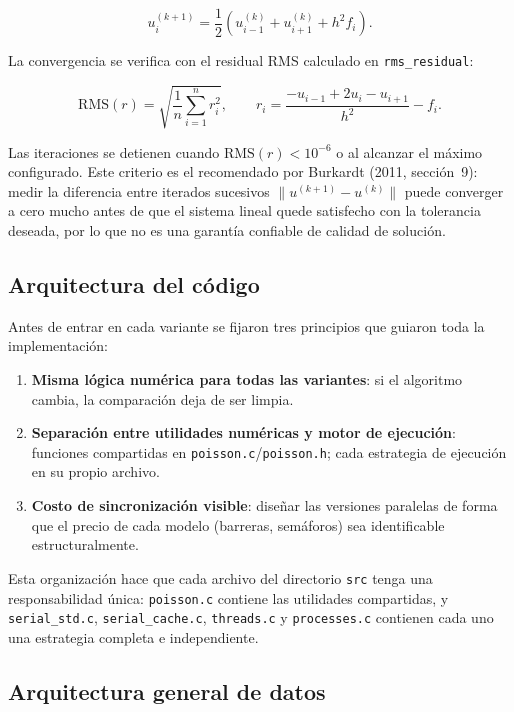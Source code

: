 \begin{equation}
    u_i^{(k+1)} = \frac{1}{2}\left(u_{i-1}^{(k)} + u_{i+1}^{(k)} + h^2 f_i\right).
    \label{eq:jacobi}
\end{equation}

La convergencia se verifica con el residual RMS calculado en \texttt{rms\_residual}:

\begin{equation}
    \mathrm{RMS}(r) = \sqrt{\frac{1}{n}\sum_{i=1}^{n} r_i^2}, \qquad r_i = \frac{-u_{i-1}+2u_i-u_{i+1}}{h^2} - f_i.
\end{equation}

Las iteraciones se detienen cuando $\mathrm{RMS}(r) < 10^{-6}$ o al alcanzar el máximo configurado. Este criterio es el recomendado por Burkardt (2011, sección~9): medir la diferencia entre iterados sucesivos $\|u^{(k+1)} - u^{(k)}\|$ puede converger a cero mucho antes de que el sistema lineal quede satisfecho con la tolerancia deseada, por lo que no es una garantía confiable de calidad de solución.

\subsection{Arquitectura del código}

Antes de entrar en cada variante se fijaron tres principios que guiaron toda la implementación:

\begin{enumerate}
    \item \textbf{Misma lógica numérica para todas las variantes}: si el algoritmo cambia, la comparación deja de ser limpia.
    \item \textbf{Separación entre utilidades numéricas y motor de ejecución}: funciones compartidas en \texttt{poisson.c}/\texttt{poisson.h}; cada estrategia de ejecución en su propio archivo.
    \item \textbf{Costo de sincronización visible}: diseñar las versiones paralelas de forma que el precio de cada modelo (barreras, semáforos) sea identificable estructuralmente.
\end{enumerate}

Esta organización hace que cada archivo del directorio \texttt{src} tenga una responsabilidad única: \texttt{poisson.c} contiene las utilidades compartidas, y \texttt{serial\_std.c}, \texttt{serial\_cache.c}, \texttt{threads.c} y \texttt{processes.c} contienen cada uno una estrategia completa e independiente.

\subsection{Arquitectura general de datos}

